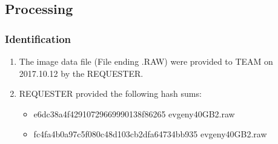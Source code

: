 \subsection{Processing}
\subsubsection{Identification}
\begin{enumerate}
	\item The image data file (File ending .RAW) were provided to TEAM on 2017.10.12 by the REQUESTER.
	\item REQUESTER provided the following hash sums:
		\begin{itemize}
			\item e6dc38a4f42910729669990138f86265  evgeny\textunderscore 40GB\textunderscore2.raw
			\item fc4fa4b0a97c5f080c48d103cb2dfa64734bb935 evgeny\textunderscore 40GB\textunderscore2.raw
		\end{itemize}
\end{enumerate}
